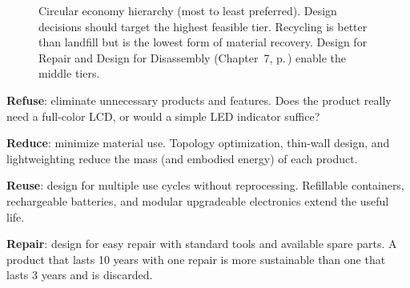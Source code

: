 \documentclass[11pt,letterpaper,twoside,openany]{book}
\begin{document}
\begin{figure}[htbp]\centering
{}
\caption{Circular economy hierarchy (most to least preferred). Design decisions should target the highest feasible tier. Recycling is better than landfill but is the lowest form of material recovery. Design for Repair and Design for Disassembly (Chapter~7, p.\,\pageref{ch:oandm}) enable the middle tiers.}\label{fig:circular_hierarchy}
\end{figure}

\textbf{Refuse}: eliminate unnecessary products and features. Does the product really need a full-color LCD, or would a simple LED indicator suffice?

\textbf{Reduce}: minimize material use. Topology optimization, thin-wall design, and lightweighting reduce the mass (and embodied energy) of each product.

\textbf{Reuse}: design for multiple use cycles without reprocessing. Refillable containers, rechargeable batteries, and modular upgradeable electronics extend the useful life.

\textbf{Repair}: design for easy repair with standard tools and available spare parts. A product that lasts 10 years with one repair is more sustainable than one that lasts 3 years and is discarded.
\end{document}

